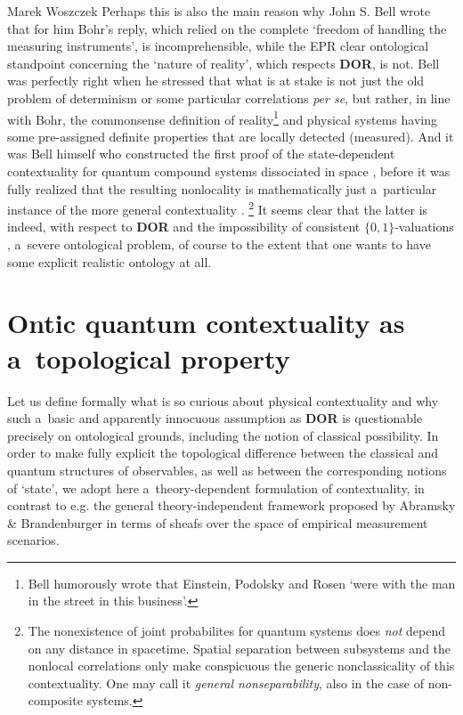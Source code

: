 \begin{artengenv}{Marek Woszczek}
Perhaps this is also the main reason why John S. Bell
\parencite*[][pp.58–59]{bell_bertlmanns_1981} %
 wrote that for him Bohr's reply, which relied on the complete ‘freedom of handling the measuring instruments', is incomprehensible, while the EPR clear ontological standpoint concerning the ‘nature of reality', which respects \textbf{DOR}, is not. Bell was perfectly right when he stressed that what is at stake is not just the old problem of determinism or some particular correlations \textit{per se}, but rather, in line with Bohr, the commonsense definition of reality\footnote{Bell 
\parencite*[][pp.45–46]{bell_bertlmanns_1981} %
 humorously wrote that Einstein, Podolsky and Rosen ‘were with the man in the street in this business'.} and physical systems having some pre-assigned definite properties that are locally detected (measured). And it was Bell himself who constructed the first proof of the state-dependent contextuality for quantum compound systems dissociated in space 
\parencite[][]{bell_einstein-podolsky-rosen_1964}, %
 before it was fully realized that the resulting nonlocality is mathematically just a~particular instance of the more general contextuality 
\parencites[e.g.][]{horodecki_axiomatic_2015}[][]{acin_combinatorial_2015}.%
\footnote{The nonexistence of joint probabilites for quantum systems does \textit{not} depend on any distance in spacetime. Spatial separation between subsystems and the nonlocal correlations only make conspicuous the generic nonclassicality of this contextuality. One may call it \textit{general nonseparability}, also in the case of non-composite systems.} It seems clear that the latter is indeed, with respect to \textbf{DOR} and the impossibility of consistent $\{0,1\}$-valuations 
\parencite[][p.699]{bohr_can_1935}, %
 a~severe ontological problem, of course to the extent that one wants to have some explicit realistic ontology at all.

\section{Ontic quantum contextuality as a~topological property}
Let us define formally what is so curious about physical contextuality and why such a~basic and apparently innocuous assumption as \textbf{DOR} is questionable precisely on ontological grounds, including the notion of classical possibility. In order to make fully explicit the topological difference between the classical and quantum structures of observables, as well as between the corresponding notions of ‘state', we adopt here a~theory-dependent formulation of contextuality, in contrast to e.g. the general theory-independent framework proposed by Abramsky \& Brandenburger
\parencite*[][]{abramsky_sheaf-theoretic_2011} %
 in terms of sheafs over the space of empirical measurement scenarios.


\end{artengenv}
